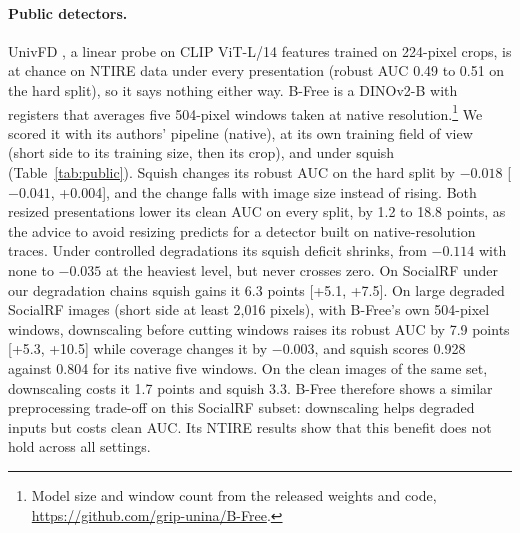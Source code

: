 \documentclass[letterpaper]{article} %
\begin{document}
\paragraph{Public detectors.} UnivFD \cite{ojha2023univfd}, a linear probe on
CLIP ViT-L/14 features trained on 224-pixel crops, is at chance on NTIRE data
under every presentation (robust AUC 0.49 to 0.51 on the hard split), so it
says nothing either way. B-Free \cite{guillaro2025bfree} is a DINOv2-B with
registers that averages five 504-pixel windows taken at native
resolution.\footnote{Model size and window count from the released weights
and code, \url{https://github.com/grip-unina/B-Free}.} We scored it with its
authors' pipeline (native), at its own training field of view (short side to
its training size, then its crop), and under squish (Table~\ref{tab:public}).
Squish changes its robust AUC on the hard split by $-0.018$ [$-0.041$,
+0.004], and the change falls with image size instead of rising. Both resized
presentations lower its clean AUC on every split, by 1.2 to 18.8 points, as
the advice to avoid resizing predicts for a detector built on
native-resolution traces. Under controlled degradations its squish deficit
shrinks, from $-0.114$ with none to $-0.035$ at the heaviest level, but never
crosses zero. On SocialRF under our degradation chains squish gains it 6.3
points [+5.1, +7.5]. On large degraded SocialRF images (short side at least 2,016
pixels), with B-Free's own 504-pixel windows, downscaling before cutting
windows raises its robust AUC by 7.9 points [+5.3, +10.5] while coverage
changes it by $-0.003$, and squish scores 0.928 against 0.804 for its native
five windows. On the clean images of the same set, downscaling costs it 1.7
points and squish 3.3. B-Free therefore shows a similar preprocessing trade-off on this SocialRF
subset: downscaling helps degraded inputs but costs clean AUC. Its NTIRE
results show that this benefit does not hold across all settings.
\end{document}
